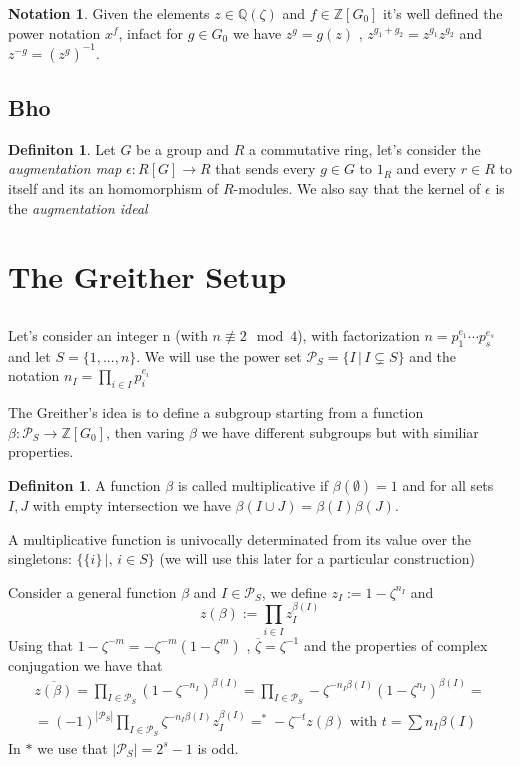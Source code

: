 \documentclass[]{article}
\theoremstyle{plain}
\theoremstyle{remark}
\theoremstyle{definition}
\newtheorem{deff}[teo]{Definiton}
\newtheorem*{nota}{Notation}
\newcommand{\PS}{\mathcal{P}_S}
\newcommand{\Z}{\mathbb{Z}}
\newcommand{\Q}{\mathbb{Q}}
\DeclareMathOperator*{\eqb }{=}
\begin{document}
	\begin{nota}
		Given the elements $ z \in \Q (\zeta) $ and $ f \in \Z[G_0]  $ it's well defined the power notation $ x^f $, infact for $ g\in G_0 $ we have $ z^g = g(z) $ , $ z ^{g_1 + g_2}= z^{g_1} z^{g_2} $ and $ z^{-g} = (z^g)^{-1} $. 
	\end{nota}
	
	\subsection{Bho}
	\begin{deff}
		Let $ G $ be a group and $ R $ a commutative ring, let's consider the \textit{augmentation map} $\epsilon : R[G] \to R$ that sends every $ g \in G $ to $ 1_R $ and every $ r \in R $ to itself and its an homomorphism of $ R $-modules. We also say that the kernel of $\epsilon$ is the \textit{augmentation ideal}
	\end{deff}

\section{The Greither Setup}

	\subsection*{}
	Let's consider an integer n (with $n \not \equiv 2 \mod 4$), with factorization $ n= p_1 ^{e_1} \cdots p_s ^{e_s} $ and let $ S = \{1, ... , n \}$. We will use the power set $ \PS = \{ I \,|\, I \subsetneq S\}$ and the notation $ n_I = \prod_{i \in I} p_i ^{e_i} $ 
	
	The Greither's idea is to define a subgroup starting from a function $ \beta : \PS \to \Z[G_0] $, then varing $\beta$ we have different subgroups but with similiar properties. 
	
	\begin{deff}
		A function $\beta$ is called multiplicative if $ \beta (\emptyset) = 1 $ and for all sets $ I,J $ with empty intersection we have $ \beta (I\cup J) = \beta(I) \beta(J)$.
	\end{deff}

	A multiplicative function is univocally determinated from its value over the singletons: $ \{\{i\} \,|,\, i \in S\} $ (we will use this later for a particular construction)

	Consider a general function $\beta$ and $ I \in \PS $, we define $ z_I  := 1 - \zeta ^{n_I}$ and 
	$$ z(\beta ):= \prod_{i\in I} z_I ^{\beta(I)} $$ 
	Using that $ 1 - \zeta ^{-m} = -\zeta^{-m} ( 1 - \zeta ^m ) $ , $ \overline{ \zeta} = \zeta ^{-1}  $ and the properties of complex conjugation we have that 
	\begin{multline}\label{eq:zbetacon}
		\overline{z(\beta )} = \prod_{I \in \PS} ({1 - \zeta ^{-n_I}})^{\beta(I)}  = \prod_{I \in \PS} - \zeta ^{-n_I \beta(I)} (1 - \zeta ^{n_I})^{\beta (I)} =\\
		=(-1)^{|\PS|}\prod_{I \in \PS} \zeta ^{-n_I \beta(I)} z_I^{\beta (I)} \eqb^\ast - \zeta^{-t} z(\beta) \text{ with } t = \sum n_I \beta(I)
	\end{multline}
	In $\ast$ we use that $ |\PS| = 2^s -1 $ is odd. 
	
\end{document}
